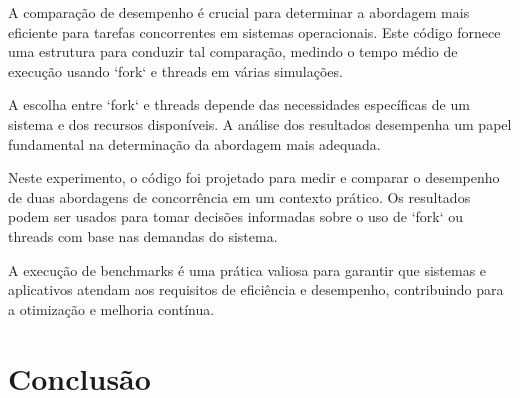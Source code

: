 \documentclass[
	12pt,				%
	openright,			%
	oneside,			%
	a4paper,			%
	chapter=TITLE,		%
	english,			%
	french,				%
	spanish,			%
	brazil				%
	]{abntex2}
\theoremstyle{definition}
\begin{document}
A comparação de desempenho é crucial para determinar a abordagem mais eficiente para tarefas concorrentes em sistemas operacionais. Este código fornece uma estrutura para conduzir tal comparação, medindo o tempo médio de execução usando `fork` e threads em várias simulações.

A escolha entre `fork` e threads depende das necessidades específicas de um sistema e dos recursos disponíveis. A análise dos resultados desempenha um papel fundamental na determinação da abordagem mais adequada.


Neste experimento, o código foi projetado para medir e comparar o desempenho de duas abordagens de concorrência em um contexto prático. Os resultados podem ser usados para tomar decisões informadas sobre o uso de `fork` ou threads com base nas demandas do sistema.

A execução de benchmarks é uma prática valiosa para garantir que sistemas e aplicativos atendam aos requisitos de eficiência e desempenho, contribuindo para a otimização e melhoria contínua.



\chapter{Conclusão}
\label{conclusao}





\postextual



\cite{tanenbaum2010sistemas}
\end{document}
